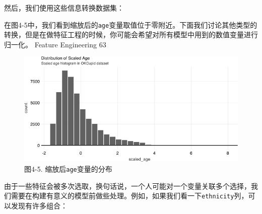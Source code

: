 \documentclass[
]{article}
\newenvironment{Shaded}{\begin{snugshade}}{\end{snugshade}}
\newcommand{\DataTypeTok}[1]{\textcolor[rgb]{0.13,0.29,0.53}{#1}}
\newcommand{\KeywordTok}[1]{\textcolor[rgb]{0.13,0.29,0.53}{\textbf{#1}}}
\newcommand{\NormalTok}[1]{#1}
\newcommand{\OperatorTok}[1]{\textcolor[rgb]{0.81,0.36,0.00}{\textbf{#1}}}
\newcommand{\StringTok}[1]{\textcolor[rgb]{0.31,0.60,0.02}{#1}}
\begin{document}
然后，我们使用这些信息转换数据集：

\begin{Shaded}
\end{Shaded}

在图4-5中，我们看到缩放后的\texttt{age}变量取值位于零附近。下面我们讨论其他类型的转换，但是在做特征工程的时候，你可能会希望对所有模型中用到的数值变量进行归一化。
Feature Engineering \textbar{} 63

\begin{figure}
\centering
\includegraphics{figures/4_5.png}
\caption{图4-5. 缩放后\texttt{age}变量的分布}
\end{figure}

由于一些特征会被多次选取，换句话说，一个人可能对一个变量关联多个选择，我们需要在构建有意义的模型前做些处理。例如，如果我们看一下\texttt{ethnicity}列，可以发现有许多组合：
\end{document}

